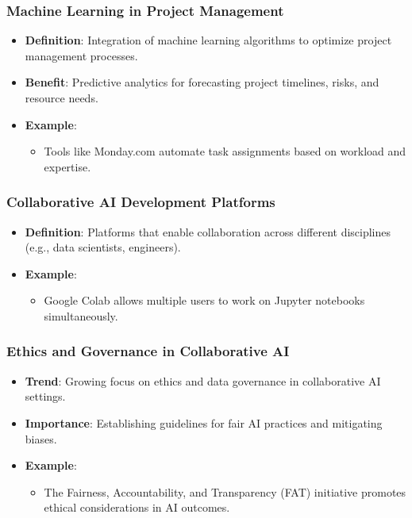 \documentclass[aspectratio=169]{beamer}
\begin{document}
\begin{frame}[fragile]
    \frametitle{Machine Learning in Project Management}
    \begin{itemize}
        \item \textbf{Definition}: Integration of machine learning algorithms to optimize project management processes.
        \item \textbf{Benefit}: Predictive analytics for forecasting project timelines, risks, and resource needs.
        \item \textbf{Example}: 
        \begin{itemize}
            \item Tools like Monday.com automate task assignments based on workload and expertise.
        \end{itemize}
    \end{itemize}
\end{frame}

\begin{frame}[fragile]
    \frametitle{Collaborative AI Development Platforms}
    \begin{itemize}
        \item \textbf{Definition}: Platforms that enable collaboration across different disciplines (e.g., data scientists, engineers).
        \item \textbf{Example}: 
        \begin{itemize}
            \item Google Colab allows multiple users to work on Jupyter notebooks simultaneously.
        \end{itemize}
    \end{itemize}
\end{frame}

\begin{frame}[fragile]
    \frametitle{Ethics and Governance in Collaborative AI}
    \begin{itemize}
        \item \textbf{Trend}: Growing focus on ethics and data governance in collaborative AI settings.
        \item \textbf{Importance}: Establishing guidelines for fair AI practices and mitigating biases.
        \item \textbf{Example}: 
        \begin{itemize}
            \item The Fairness, Accountability, and Transparency (FAT) initiative promotes ethical considerations in AI outcomes.
        \end{itemize}
    \end{itemize}
\end{frame}
\end{document}
